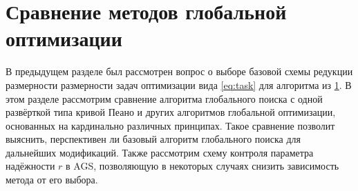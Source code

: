 \section{Сравнение методов глобальной оптимизации}

В предыдущем разделе был рассмотрен вопрос о выборе базовой схемы редукции размерности размерности задач оптимизации вида \ref{eq:task} для
алгоритма из \ref{}. В этом разделе рассмотрим сравнение алгоритма глобального поиска с одной развёрткой типа кривой Пеано
и других алгоритмов глобальной оптимизации, основанных на кардинально различных принципах. Такое сравнение позволит
выяснить, перспективен ли базовый алгоритм глобального поиска для дальнейших модификаций. Также рассмотрим схему контроля
параметра надёжности \(r\) в AGS, позволяющую в некоторых случаях снизить зависимость метода от его выбора.

